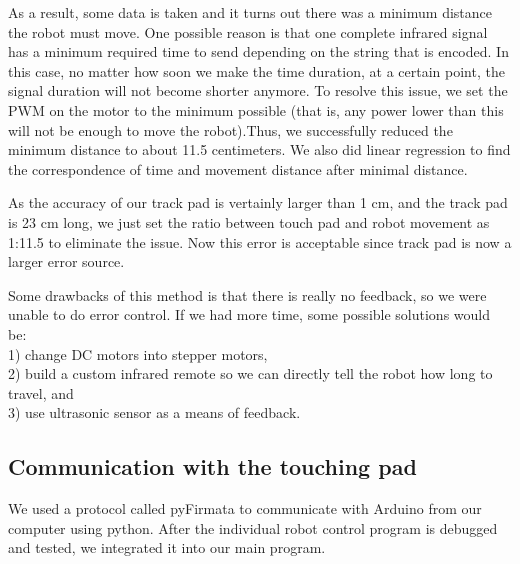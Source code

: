 \documentclass[reprint,amsmath, amsfonts, amssymb, aps, letterpaper]{revtex4-1}
\begin{document}
As a result, some data is taken and it turns out there was a minimum distance the robot must move. One possible reason is that one complete infrared signal has a minimum required time to send depending on the string that is encoded. In this case, no matter how soon we make the time duration, at a certain point, the signal duration will not become shorter anymore. To resolve this issue, we set the PWM on the motor to the minimum possible (that is, any power lower than this will not be enough to move the robot).Thus, we successfully reduced the minimum distance to about 11.5 centimeters. We also did linear regression to find the correspondence of time and movement distance after minimal distance.

As the accuracy of our track pad is vertainly larger than 1 cm, and the track pad is 23 cm long, we just set the ratio between touch pad and robot movement as 1:11.5 to eliminate the issue. Now this error is acceptable since track pad is now a larger error source.

Some drawbacks of this method is that there is really no feedback, so we were unable to do error control. If we had more time, some possible solutions would be: \\
1) change DC motors into stepper motors, \\
2) build a custom infrared remote so we can directly tell the robot how long to travel, and \\
3) use ultrasonic sensor as a means of feedback.
\subsection{Communication with the touching pad}

We used a protocol called pyFirmata to communicate with Arduino from our computer using python. After the individual robot control program is debugged and tested, we integrated it into our main program.


\nocite{*}
\end{document}
